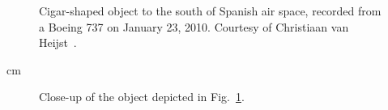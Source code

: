 \newpage
%
\begin{figure}[b]
\sidecaption
%
%
\caption{Cigar-shaped object to the south of Spanish air space, recorded from a Boeing 737 on January 23, 2010.
Courtesy of Christiaan van Heijst~\cite{vanHeijst2010Jan}.}

\label{2023-UFO-part-History-photos-2010-csssp-c}       %
\end{figure}

 cm

%
\begin{figure}[b]
\sidecaption
%
%
\caption{Close-up of the object depicted in Fig.~\ref{2023-UFO-part-History-photos-2010-csssp-c}.}
\label{2023-UFO-part-History-photos-2010-csssp-cu}       %
\end{figure}

